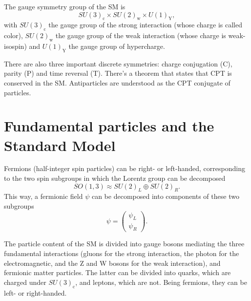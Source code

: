 The gauge symmetry group of the SM is
\begin{equation}
SU(3)_{\textrm{c}}\times SU(2)_{\textrm{w}}\times U(1)_{\textrm{Y}},
\end{equation}
with $SU(3)_{\textrm{c}}$ the gauge group of the strong interaction (whose charge is called color), $SU(2)_{\textrm{w}}$ the gauge group of the weak interaction (whose charge is weak-isospin) and $U(1)_{\textrm{Y}}$ the gauge group of hypercharge. 

There are also three important discrete symmetries: charge conjugation (C), parity (P) and time reversal (T). There's a theorem that states that CPT is conserved in the SM. Antiparticles are understood as the CPT conjugate of particles.

\section*{Fundamental particles and the Standard Model}

Fermions (half-integer spin particles) can be right- or left-handed, corresponding to the two spin subgroups in which the Lorentz group can be decomposed 
\begin{equation}
SO(1,3)\approx SU(2)_L\oplus  SU(2)_R.
\end{equation}
This way, a fermionic field $\psi$ can be decomposed into components of these two subgroups
\begin{equation}
\psi=\begin{pmatrix}
\psi_L\\ 
\psi_R
\end{pmatrix}.
\end{equation}

The particle content of the SM is divided into gauge bosons mediating the three fundamental interactions (gluons for the strong interaction, the photon for the electromagnetic, and the Z and W bosons for the weak interaction), and fermionic matter particles. The latter can be divided into quarks, which are charged under $SU(3)_{\textrm{c}}$, and leptons, which are not. Being fermions, they can be left- or right-handed. 

